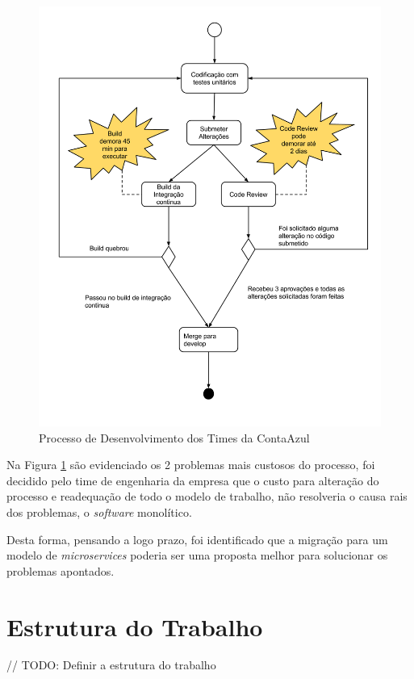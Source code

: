 \begin{figure}[hb]
	\begin{center}
		\includegraphics[width=12cm]{assets/processo_desenvolvimento.png}
		\caption{Processo de Desenvolvimento dos Times da ContaAzul}
		\label{fig:01}
	\end{center}
\end{figure}

Na Figura \ref{fig:01} são evidenciado os 2 problemas mais custosos do processo, foi decidido pelo time de engenharia da empresa que o custo para alteração do processo e readequação de todo o modelo de trabalho, não resolveria o causa rais dos problemas, o \textit{software} monolítico.

Desta forma, pensando a logo prazo, foi identificado que a migração para um modelo de \textit{microservices} poderia ser uma proposta melhor para solucionar os problemas apontados.

\section{Estrutura do Trabalho}

// TODO: Definir a estrutura do trabalho 

